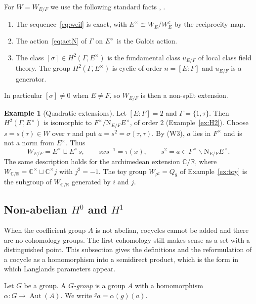 \documentclass[12pt,letterpaper]{article}
\numberwithin{equation}{section}
\theoremstyle{plain}
\theoremstyle{definition}
\newtheorem{example}[theorem]{Example}
\newcommand{\C}{\mathbb{C}}
\newcommand{\R}{\mathbb{R}}
\newcommand{\act}[2]{{}^{#1}\!#2}          %
\DeclareMathOperator{\Aut}{Aut}
\newcommand{\Nm}{\mathrm{N}_{E/F}}
\begin{document}
For $W=W_{E/F}$ we use the following standard facts
\cite[\S1]{Ta79}, \cite[Ch.~XV]{AT68}.

\begin{enumerate}[label=\textup{(W\arabic*)},itemsep=1pt]
\item The sequence~\eqref{eq:weil} is exact, with $E^\times\cong W_E/W_E^c$
by the reciprocity map.
\item The action~\eqref{eq:actN} of $\Gamma$ on $E^\times$ is the Galois
action.
\item The class $[\sigma]\in H^2(\Gamma,E^\times)$ is the fundamental class
$u_{E/F}$ of local class field theory. The group $H^2(\Gamma,E^\times)$ is
cyclic of order $n=[E:F]$ and $u_{E/F}$ is a generator.
\end{enumerate}

In particular $[\sigma]\neq0$ when $E\neq F$, so $W_{E/F}$ is then a
non-split extension.

\begin{example}[Quadratic extensions]\label{ex:weil-quad}
Let $[E:F]=2$ and $\Gamma=\{1,\tau\}$. Then $H^2(\Gamma,E^\times)$ is
isomorphic to $F^\times/\Nm E^\times$, of order $2$
(Example~\ref{ex:H2}). Choose $s=s(\tau)\in W$ over $\tau$ and put
$a=s^2=\sigma(\tau,\tau)$. By (W3), $a$ lies in $F^\times$ and is not a
norm from $E^\times$. Thus
\[
W_{E/F}=E^\times\sqcup E^\times s,\qquad sxs^{-1}=\tau(x),\qquad
s^2=a\in F^\times\smallsetminus\Nm E^\times .
\]
The same description holds for the archimedean extension $\C/\R$, where
$W_{\C/\R}=\C^\times\sqcup\C^\times j$ with $j^2=-1$. The toy group
$W_{\rho^2}=Q_8$ of Example~\ref{ex:toy} is the subgroup of $W_{\C/\R}$
generated by $i$ and $j$.
\end{example}

\subsection{Non-abelian \texorpdfstring{$H^0$}{H0} and \texorpdfstring{$H^1$}{H1}}

When the coefficient group $A$ is not abelian, cocycles cannot be added
and there are no cohomology groups. The first cohomology still makes
sense as a set with a distinguished point. This subsection gives the
definitions and the reformulation of a cocycle as a homomorphism into a
semidirect product, which is the form in which Langlands parameters
appear.

Let $G$ be a group. A \emph{$G$-group} is a group $A$ with a homomorphism
$\alpha:G\to\Aut(A)$. We write $\act{g}{a}=\alpha(g)(a)$.
\end{document}
